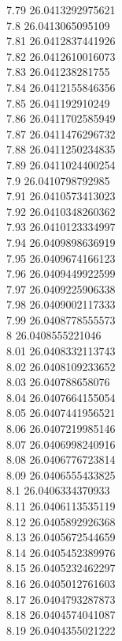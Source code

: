 {7.79	26.0413292975621\\
7.8	26.0413065095109\\
7.81	26.0412837441926\\
7.82	26.0412610016073\\
7.83	26.041238281755\\
7.84	26.0412155846356\\
7.85	26.041192910249\\
7.86	26.0411702585949\\
7.87	26.0411476296732\\
7.88	26.0411250234835\\
7.89	26.0411024400254\\
7.9	26.0410798792985\\
7.91	26.0410573413023\\
7.92	26.0410348260362\\
7.93	26.0410123334997\\
7.94	26.0409898636919\\
7.95	26.0409674166123\\
7.96	26.0409449922599\\
7.97	26.0409225906338\\
7.98	26.0409002117333\\
7.99	26.0408778555573\\
8	26.0408555221046\\
8.01	26.0408332113743\\
8.02	26.0408109233652\\
8.03	26.040788658076\\
8.04	26.0407664155054\\
8.05	26.0407441956521\\
8.06	26.0407219985146\\
8.07	26.0406998240916\\
8.08	26.0406776723814\\
8.09	26.0406555433825\\
8.1	26.0406334370933\\
8.11	26.0406113535119\\
8.12	26.0405892926368\\
8.13	26.0405672544659\\
8.14	26.0405452389976\\
8.15	26.0405232462297\\
8.16	26.0405012761603\\
8.17	26.0404793287873\\
8.18	26.0404574041087\\
8.19	26.0404355021222\\
}
